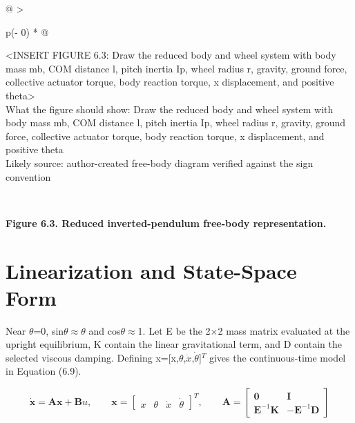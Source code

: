 \begin{longtable}[]{@{}
  >{\raggedright\arraybackslash}p{(\columnwidth - 0\tabcolsep) * }@{}}
\toprule\noalign{}
\begin{minipage}[b]{\linewidth}\raggedright
\textless INSERT FIGURE 6.3: Draw the reduced body and wheel system with
body mass mb, COM distance l, pitch inertia Ip, wheel radius r, gravity,
ground force, collective actuator torque, body reaction torque, x
displacement, and positive theta\textgreater{}\\
What the figure should show: Draw the reduced body and wheel system with
body mass mb, COM distance l, pitch inertia Ip, wheel radius r, gravity,
ground force, collective actuator torque, body reaction torque, x
displacement, and positive theta\\
Likely source: author-created free-body diagram verified against the
sign convention\strut
\end{minipage} \\
\midrule\noalign{}
\endhead
\bottomrule\noalign{}
\endlastfoot
\end{longtable}

\begin{center}\singlespacing
{}
\textbf{Figure 6.3. Reduced inverted-pendulum free-body representation.}
\end{center}

\section{Linearization and State-Space Form}\label{linearization-and-state-space-form}

Near \ensuremath{\theta}=0, sin\ensuremath{\theta}\ensuremath{\approx}\ensuremath{\theta} and cos\ensuremath{\theta}\ensuremath{\approx}1. Let E be the 2\ensuremath{\times}2 mass matrix evaluated at
the upright equilibrium, K contain the linear gravitational term, and D
contain the selected viscous damping. Defining x=[x,\ensuremath{\theta},\ensuremath{\dot{x}},\ensuremath{\dot{\theta}}]\ensuremath{^{T}} gives
the continuous-time model in Equation (6.9).

\begin{equation}
\dot{\mathbf{x}}=\mathbf{A}\mathbf{x}+\mathbf{B}u,\qquad
\mathbf{x}=\begin{bmatrix}x&\theta&\dot{x}&\dot{\theta}\end{bmatrix}^{T},\qquad
\mathbf{A}=\begin{bmatrix}\mathbf{0}&\mathbf{I}\\
\mathbf{E}^{-1}\mathbf{K}&-\mathbf{E}^{-1}\mathbf{D}\end{bmatrix}
\label{eq:6-9}
\end{equation}

